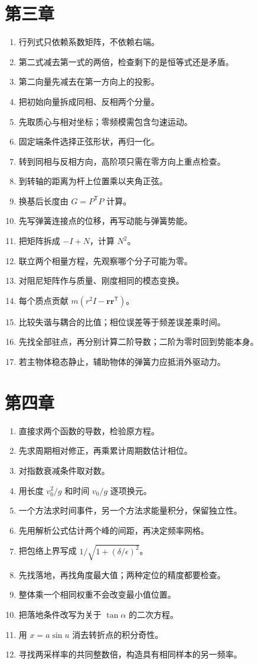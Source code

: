 \documentclass[11pt,openany,fontset=fandol]{ctexbook}
\theoremstyle{plain}\newtheorem{theorem}{定理}[chapter]\newtheorem{proposition}[theorem]{命题}
\theoremstyle{definition}\newtheorem{definition}{定义}[chapter]\newtheorem{example}{例}[chapter]
\theoremstyle{remark}\newtheorem*{remark}{说明}
\newcommand{\vct}[1]{\bm{#1}}\newcommand{\Rea}{\operatorname{Re}}\newcommand{\Ima}{\operatorname{Im}}
\begin{document}
\section{第三章}
\begin{enumerate}[label=3.\arabic*]
\item 行列式只依赖系数矩阵，不依赖右端。
\item 第二式减去第一式的两倍，检查剩下的是恒等式还是矛盾。
\item 第二向量先减去在第一方向上的投影。
\item 把初始向量拆成同相、反相两个分量。
\item 先取质心与相对坐标；零频模需包含匀速运动。
\item 固定端条件选择正弦形状，再归一化。
\item 转到同相与反相方向，高阶项只需在零方向上重点检查。
\item 到转轴的距离为杆上位置乘以夹角正弦。
\item 换基后长度由 $G=P^{\mathsf T}P$ 计算。
\item 先写弹簧连接点的位移，再写动能与弹簧势能。
\item 把矩阵拆成 $-I+N$，计算 $N^2$。
\item 联立两个相量方程，先观察哪个分子可能为零。
\item 对阻尼矩阵作与质量、刚度相同的模态变换。
\item 每个质点贡献 $m(r^2I-\vct r\vct r^{\mathsf T})$。
\item 比较失谐与耦合的比值；相位误差等于频差误差乘时间。
\item 先找全部驻点，再分别计算二阶导数；二阶为零时回到势能本身。
\item 若主物体稳态静止，辅助物体的弹簧力应抵消外驱动力。
\end{enumerate}
\section{第四章}
\begin{enumerate}[label=4.\arabic*]
\item 直接求两个函数的导数，检验原方程。
\item 先求周期相对修正，再乘累计周期数估计相位。
\item 对指数衰减条件取对数。
\item 用长度 $v_0^2/g$ 和时间 $v_0/g$ 逐项换元。
\item 一个方法求时间事件，另一个方法求能量积分，保留独立性。
\item 先用解析公式估计两个峰的间距，再决定频率网格。
\item 把包络上界写成 $1/\sqrt{1+(\delta/\epsilon)^2}$。
\item 先找落地，再找角度最大值；两种定位的精度都要检查。
\item 整体乘一个相同权重不会改变最小值位置。
\item 把落地条件改写为关于 $\tan\alpha$ 的二次方程。
\item 用 $x=a\sin u$ 消去转折点的积分奇性。
\item 寻找两采样率的共同整数倍，构造具有相同样本的另一频率。
\end{enumerate}
\end{document}

